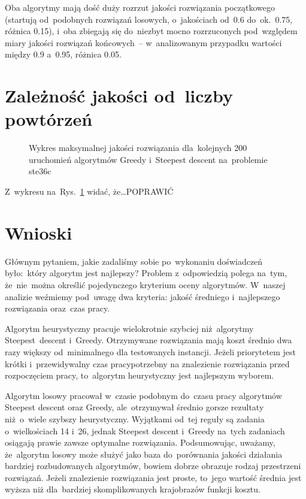 \documentclass[a4paper,10pt]{article}
\begin{document}
Oba algorytmy mają dość duży rozrzut jakości rozwiązania początkowego (startują od~podobnych rozwiązań losowych, o~jakościach
od~\num{0.6} do~ok.~\num{0.75}, różnica \num{0.15}), i~oba zbiegają się do~niezbyt mocno rozrzuconych pod~względem miary jakości rozwiązań końcowych~--
w~analizowanym przypadku wartości między \num{0.9} a~\num{0.95}, różnica \num{0.05}.

\section{Zależność jakości od~liczby powtórzeń}
\begin{figure}[!htpb]
\begin{center}

\caption{Wykres maksymalnej jakości rozwiązania dla~kolejnych 200 uruchomień algorytmów Greedy i~Steepest descent na~problemie ste36c}
\label{fig:qualityrunno}
\end{center}
\end{figure}

Z~wykresu na~Rys.~\ref{fig:qualityrunno} widać, że\ldots POPRAWIĆ

\section{Wnioski}
Głównym pytaniem, jakie zadaliśmy sobie po~wykonaniu doświadczeń było:~który algorytm jest najlepszy?
Problem z~odpowiedzią polega na~tym, że~nie~można określić pojedynczego kryterium oceny algorytmów.
W~naszej analizie weźmiemy pod~uwagę dwa kryteria: jakość średniego i~najlepszego rozwiązania oraz~czas pracy.

Algorytm heurystyczny pracuje wielokrotnie szybciej niż~algorytmy Steepest~descent i~Greedy.
Otrzymywane rozwiązania mają koszt średnio dwa razy większy od~minimalnego dla testowanych instancji.
Jeżeli priorytetem jest krótki i~przewidywalny czas pracypotrzebny na znalezienie rozwiązania przed rozpoczęciem pracy, to~algorytm heurystyczny jest najlepszym wyborem.

Algorytm losowy pracował w~czasie podobnym do~czasu pracy algorytmów Steepest descent oraz Greedy, ale~otrzymywał średnio gorsze
rezultaty niż~o~wiele szybszy heurystyczny.
Wyjątkami od~tej reguły są zadania o~wielkościach 14 i~26, jednak Steepest descent i~Greedy na~tych zadaniach osiągają prawie zawsze optymalne rozwiązania.
Podsumowując, uważamy, że~algorytm losowy może służyć jako baza do~porównania jakości działania bardziej rozbudowanych algorytmów,
bowiem dobrze obrazuje rodzaj przestrzeni rozwiązań.
Jeżeli znalezienie rozwiązania jest proste, to~jego wartość średnia jest wyższa niż dla~bardziej skomplikowanych krajobrazów funkcji
kosztu.
\end{document}
